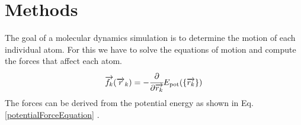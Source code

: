 \chapter{Methods}
\begin{comment}
	0. Verlet Step
	1. Describe the Lenard Jones Potential
	2. Describe the Berendsen Thermostat
	3. Describe the Gupta 
	
\end{comment}
\begin{comment}
	Atoms are discreticed into the Postitions, Velocities and Forces 
	Second propagate the atom in the discriticed realm given constant Forces
		-> Velocity-Verlet Integration
	
	Compute Forces somehow
	-> Potentials
	LJ Potential 
	Gupta Potential
	
	Thermodynamic Effects
	Berendsen Thermostat
		->Gentle Way of resealing the Velocities
		
\end{comment}
\begin{comment}
goals of a md simulation
- determine the motion of each atom
	-> solve equation of motion 
	-> compute forces
	-> From the dirivation of the potential energy we can get the forces

- disciticed in time

\end{comment}
The goal of a molecular dynamics simulation is to determine the motion of each individual atom. For this we have to solve the equations of motion and compute the forces that affect each atom.
\begin{equation}
	\label{potentialForceEquation}
	\overrightarrow{f_{k}}(\overrightarrow{r}_k) = -\cfrac{\displaystyle\partial}{\displaystyle \partial \overrightarrow{r_{k}}} E_{\mathrm{pot}}(\{\overrightarrow{r_{k}}\}) 
\end{equation}
The forces can be derived from the potential energy as shown in Eq.  \ref{potentialForceEquation} \cite[][]{molDymCourse}. 


